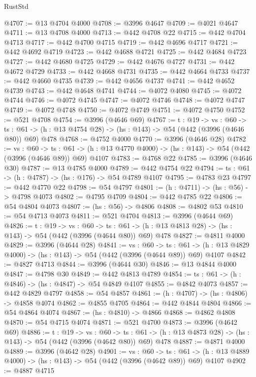 \begin{lexlean}{RustStd}
\begin{coremodule}
@4707 := @13 @4704 @4000
@4708 := @3996 @4647
@4709 := @4021 @4647
@4711 := @13 @4708 @4000
@4713 := @442 @4708 @22
@4715 := @442 @4704 @4713
@4717 := @442 @4700 @4715
@4719 := @442 @4696 @4717
@4721 := @442 @4692 @4719
@4723 := @442 @4688 @4721
@4725 := @442 @4684 @4723
@4727 := @442 @4680 @4725
@4729 := @442 @4676 @4727
@4731 := @442 @4672 @4729
@4733 := @442 @4668 @4731
@4735 := @442 @4664 @4733
@4737 := @442 @4660 @4735
@4739 := @442 @4656 @4737
@4741 := @442 @4652 @4739
@4743 := @442 @4648 @4741
@4744 := @4072 @4080
@4745 := @4072 @4744
@4746 := @4072 @4745
@4747 := @4072 @4746
@4748 := @4072 @4747
@4749 := @4072 @4748
@4750 := @4072 @4749
@4751 := @4072 @4750
@4752 := @521 @4708
@4754 := @3996 (@4646 @69)
@4767 := {t : @19} ->
  {vs : @60} ->
  {ts : @61} -> (h : @13 @4754 @28) -> (hs : @143) -> @54 (@442 (@3996 (@4646 @80)) @69) @478
@4768 := @4752 @4000
@4770 := @3996 (@4646 @28)
@4782 := {vs : @60} ->
  {ts : @61} -> (h : @13 @4770 @4000) -> (hs : @143) -> @54 (@442 (@3996 (@4646 @89)) @69) @4107
@4783 := @4768 @22
@4785 := @3996 (@4646 @30)
@4787 := @13 @4785 @4000
@4789 := @442 @4754 @22
@4794 := {ts : @61} -> (h : @4787) -> (hs : @176) -> @54 @4789 @4107
@4795 := @4783 @23
@4797 := @442 @4770 @22
@4798 := @54 @4797
@4801 := (h : @4711) -> (hs : @56) -> @4798 @4073
@4802 := @4795 @4709
@4804 := @442 @4785 @22
@4806 := @54 @4804 @4073
@4807 := (hs : @56) -> @4806
@4808 := @4802 @53
@4810 := @54 @4713 @4073
@4811 := @521 @4704
@4813 := @3996 (@4644 @69)
@4826 := {t : @19} ->
  {vs : @60} ->
  {ts : @61} -> (h : @13 @4813 @28) -> (hs : @143) -> @54 (@442 (@3996 (@4644 @80)) @69) @478
@4827 := @4811 @4000
@4829 := @3996 (@4644 @28)
@4841 := {vs : @60} ->
  {ts : @61} -> (h : @13 @4829 @4000) -> (hs : @143) -> @54 (@442 (@3996 (@4644 @89)) @69) @4107
@4842 := @4827 @4713
@4844 := @3996 (@4644 @30)
@4846 := @13 @4844 @4000
@4847 := @4798 @30
@4849 := @442 @4813 @4789
@4854 := {ts : @61} -> (h : @4846) -> (hs : @4847) -> @54 @4849 @4107
@4855 := @4842 @4073
@4857 := @442 @4829 @4797
@4858 := @54 @4857
@4861 := (h : @4707) -> (hs : @4806) -> @4858 @4074
@4862 := @4855 @4705
@4864 := @442 @4844 @4804
@4866 := @54 @4864 @4074
@4867 := (hs : @4810) -> @4866
@4868 := @4862 @4808
@4870 := @54 @4715 @4074
@4871 := @521 @4700
@4873 := @3996 (@4642 @69)
@4886 := {t : @19} ->
  {vs : @60} ->
  {ts : @61} -> (h : @13 @4873 @28) -> (hs : @143) -> @54 (@442 (@3996 (@4642 @80)) @69) @478
@4887 := @4871 @4000
@4889 := @3996 (@4642 @28)
@4901 := {vs : @60} ->
  {ts : @61} -> (h : @13 @4889 @4000) -> (hs : @143) -> @54 (@442 (@3996 (@4642 @89)) @69) @4107
@4902 := @4887 @4715

\end{coremodule}
\end{lexlean}
